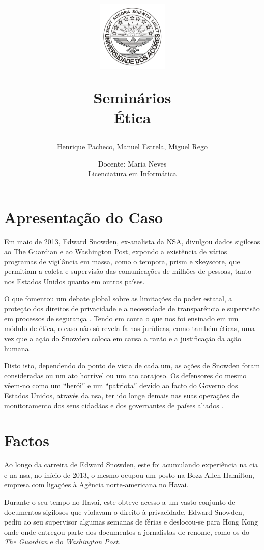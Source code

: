 \documentclass[a4paper,12pt]{article}
\title{
    \vspace{-1cm} 
    \begin{figure}[H]
        \centering
        \includegraphics[width=0.3\textwidth]{./images/uac_logo.png}
    \end{figure}
    \vspace{0.5cm} 
    \textbf{Seminários}
    \\
    Ética
}
\author{Henrique Pacheco, Manuel Estrela, Miguel Rego}
\date{Docente: Maria Neves \\ \vspace{0.5cm}Licenciatura em Informática }
\begin{document}
\maketitle

\begin{abstract}
\end{abstract}

\newpage
\tableofcontents

\newpage

\section{Apresentação do Caso}

Em maio de 2013, Edward Snowden, ex-analista da NSA, divulgou dados sigilosos ao The Guardian e ao Washington Post, expondo a existência de vários programas de vigilância em massa, como o \gls{tempora}, \gls{prism} e \gls{xkeyscore}, que permitiam a coleta e supervisão das comunicações de milhões de pessoas, tanto nos Estados Unidos quanto em outros países.

O que fomentou um debate global sobre as limitações do poder estatal, a proteção dos direitos de privacidade e a necessidade de transparência e supervisão em processos de segurança \cite{teresa}.
Tendo em conta o que nos foi ensinado em um módulo de ética, o caso não só revela falhas jurídicas, como também éticas, uma vez que a ação do Snowden coloca em causa a razão e a justificação da ação humana. 

Disto isto, dependendo do ponto de vista de cada um, as ações de Snowden foram consideradas ou um ato horrível ou um ato corajoso. Os defensores do mesmo vêem-no como um “herói” e um “patriota” devido ao facto do Governo dos Estados Unidos, através da \acrshort{nsa}, ter ido longe demais nas suas operações de monitoramento dos seus cidadãos e dos governantes de países aliados \cite{tavani}. 

\section{Factos}


Ao longo da carreira de Edward Snowden, este foi acumulando experiência na \acrshort{cia} e na \acrshort{nsa}, no início de 2013, o mesmo ocupou um posto na Bozz Allen Hamilton, empresa com ligações à Agência norte-americana no Havai.

Durante o seu tempo no Havai, este obteve acesso a um vasto conjunto de documentos sigilosos que violavam o direito à privacidade, Edward Snowden, pediu ao seu supervisor algumas semanas de férias e deslocou-se para Hong Kong onde onde entregou parte dos documentos a jornalistas de renome, como os do \textit{The Guardian} e do \textit{Washington Post}.
\end{document}
